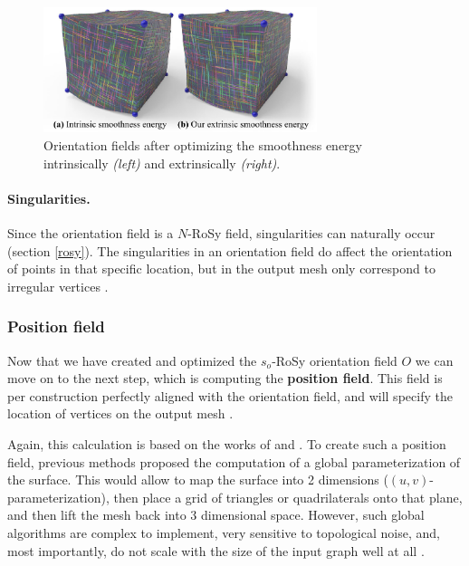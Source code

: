 \documentclass{ACGSeminar}
\begin{document}
\begin{figure}[htb!]
	\begin{centering}
		\includegraphics[width=8cm]{img/orientation-field-illustration.png}\par
	\end{centering}
	\caption{Orientation fields after optimizing the smoothness energy intrinsically \textit{(left)} and extrinsically \textit{(right)}. \cite{jakob2015instant}}
	\label{fig:orientation-field-illustration}
\end{figure}

\paragraph{Singularities.}
Since the orientation field is a $N$-RoSy field, singularities can naturally occur (section \ref{rosy}). The singularities in an orientation field do affect the orientation of points in that specific location, but in the output mesh only correspond to irregular vertices \cite{jakob2015instant}.

\subsubsection{Position field}
Now that we have created and optimized the $s_o$-RoSy orientation field $O$ we can move on to the next step, which is computing the \textbf{position field}. This field is per construction perfectly aligned with the orientation field, and will specify the location of vertices on the output mesh \cite{jakob2015instant}.\bigskip

Again, this calculation is based on the works of \cite{bommes2009mixed} and \cite{ray2006periodic}. To create such a position field, previous methods proposed the computation of a global parameterization of the surface. This would allow to map the surface into 2 dimensions ($(u,v)$-parameterization), then place a grid of triangles or quadrilaterals onto that plane, and then lift the mesh back into 3 dimensional space. However, such global algorithms are complex to implement, very sensitive to topological noise, and, most importantly, do not scale with the size of the input graph well at all \cite{jakob2015instant}.\bigskip
\end{document}
